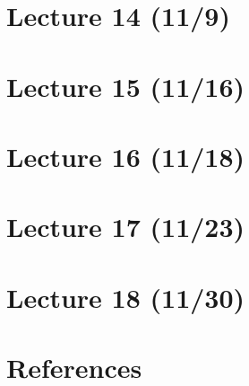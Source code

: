 \section{Lecture 14 (11/9)}

\newpage

\section{Lecture 15 (11/16)}

\newpage

\section{Lecture 16 (11/18)}

\newpage

\section{Lecture 17 (11/23)}

\newpage

\section{Lecture 18 (11/30)}

\newpage
%
%

\section*{References}
\vspace{0.1in}

